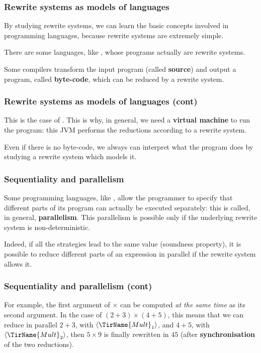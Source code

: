 %
\begin{frame}
\frametitle{Rewrite systems as models of languages}

By studying rewrite systems, we can learn the basic concepts involved
in programming languages, because rewrite systems are extremely
simple.

\bigskip

There are some languages, like \Maude, whose programs actually are
rewrite systems.

\bigskip

Some compilers transform the input program (called \textbf{source})
and output a program, called \textbf{byte-code}, which can be
reduced by a rewrite system.

\end{frame}

%
\begin{frame}
\frametitle{Rewrite systems as models of languages (cont)}

This is the case of \Java. This is why, in general, we need a
\textbf{\Java virtual machine} to run the program: this JVM performs
the reductions according to a rewrite system.

\bigskip

Even if there is no byte-code, we always can interpret what the
program does by studying a rewrite system which models it.

\end{frame}

%
\begin{frame}
\frametitle{Sequentiality and parallelism}

Some programming languages, like \Ada, allow the programmer to specify
that different parts of its program can actually be executed
separately: this is called, in general, \textbf{parallelism}. This
parallelism is possible only if the underlying rewrite system is
non-deterministic.

\bigskip

Indeed, if all the strategies lead to the same value (soundness
property), it is possible to reduce different parts of an expression
in parallel if the rewrite system allows it.

\end{frame}

%
\begin{frame}
\frametitle{Sequentiality and parallelism (cont)}

For example, the first argument of \(\times\) can be computed \emph{at
  the same time} as its second argument. In the case of \((2+3) \times
(4+5)\), this means that we can reduce in parallel \(2+3\), with
\(\rname{\TirName{Mult}_1}\), and \(4+5\), with
\(\rname{\TirName{Mult}_2}\), then \(5 \times 9\) is finally rewritten
in \(45\) (after \textbf{synchronisation} of the two reductions).

\end{frame}
